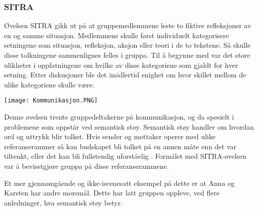 \subsubsection{SITRA}

Øvelsen SITRA gikk ut på at gruppemedlemmene leste to fiktive refleksjoner av en og samme situasjon.
Medlemmene skulle først individuelt kategorisere setningene som situasjon, refleksjon, aksjon eller teori i de to tekstene.
Så skulle disse tolkningene sammenlignes felles i gruppa.
Til å begynne med var det store ulikheter i oppfatningene om hvilke av disse kategoriene som gjaldt for hver setning.
Etter diskusjoner ble det imidlertid enighet om hvor skillet mellom de ulike kategoriene skulle være.

\begin{center}
	\texttt{[image: Kommunikasjon.PNG]}
\end{center}

Denne øvelsen trente gruppedeltakerne på kommunikasjon, og da spesielt i problemene som oppstår ved semantisk støy.
Semantisk støy handler om hvordan ord og uttrykk blir tolket.
Hvis sender og mottaker operer med ulike referanserammer så kan budskapet bli tolket på en annen måte enn det var tiltenkt, eller det kan bli fullstendig uforståelig \cite{prosjekteringsledelse}.
Formålet med SITRA-øvelsen var å bevisstgjøre gruppa på disse referanserammene.

Et mer gjennomgående og ikke-iscenesatt eksempel på dette er at Anna og Karsten har andre morsmål.
Dette har latt gruppen oppleve, ved flere anledninger, hva semantisk støy betyr.